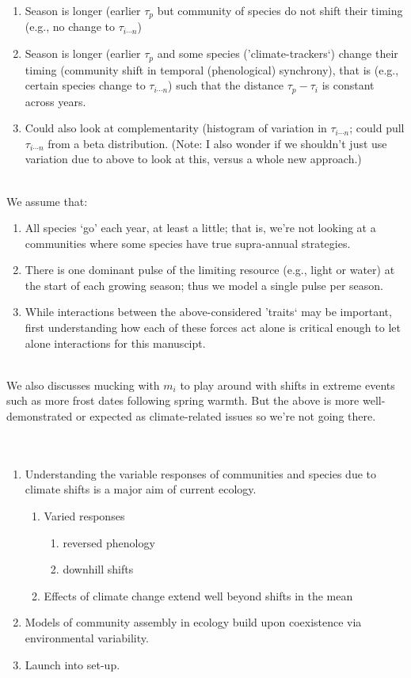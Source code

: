 \documentclass[11pt,a4paper,oneside]{article}
\begin{document}
\begin{enumerate}
\begin{enumerate}
\item Season is longer (earlier \(\tau_{p}\) but community of species
  do not shift their timing (e.g., no change to  \(\tau_{i \cdots
    n}\)) 
\item Season is longer (earlier \(\tau_{p}\) and some species ('climate-trackers`) change
  their timing (community shift in temporal (phenological) synchrony),
  that is (e.g., certain species change to  \(\tau_{i \cdots
    n}\)) such that the distance \(\tau_{p}-\tau_{i}\) is constant
  across years.
\item Could also look at complementarity (histogram of variation in \(\tau_{i \cdots
    n}\); could pull \(\tau_{i \cdots
    n}\) from a beta distribution. (Note: I also wonder if we
  shouldn't just use variation due to above to look at this, versus a
  whole new approach.)
\end{enumerate}
\end{enumerate}
\\
\noindent We assume that:
\begin{enumerate}
\item All species `go' each year, at least a little; that is, we're
  not looking at a communities where some species have true
  supra-annual strategies.
\item There is one dominant pulse of the limiting resource (e.g.,
  light or water) at the
  start of each growing season; thus we model a  single pulse per
  season.
\item While interactions between the above-considered 'traits` may be
  important, first understanding how each of these forces act alone is
  critical enough to let alone interactions for this manuscipt.
\end{enumerate}
\\
\noindent We also discusses mucking with \(m_{i}\) to play around with
shifts in extreme events such as more frost dates following spring
warmth. But the above is more well-demonstrated or expected as
climate-related issues so we're not going there.
\\
\\
\\
\begin{enumerate}
\item Understanding the variable responses of communities and species
  due to climate shifts is a major aim of current
ecology.
\begin{enumerate}
\item Varied responses
\begin{enumerate}
\item reversed phenology \citep{yu2010} 
\item downhill shifts \citep{Crimmins:2011dq}
\end{enumerate}
\item Effects of climate change extend well beyond shifts in the mean
\end{enumerate}
\item Models of community assembly in ecology build upon coexistence
  via environmental variability.
\item Launch into set-up.
\end{enumerate}
\end{document}
